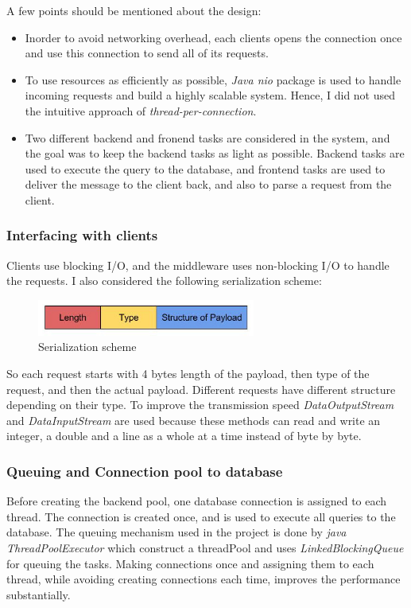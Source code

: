 \documentclass[11pt]{article}
\begin{document}
A few points should be mentioned about the design: 
\begin{itemize}
 \item Inorder to avoid networking overhead, each clients opens the connection once 
 and use this connection to send all of its requests.
 \item To use resources as efficiently as possible, \emph{Java nio} package is used 
 to handle incoming requests and build a highly scalable system. Hence, I did not used the intuitive approach of 
 \emph{thread-per-connection}. 
 \item Two different backend and fronend tasks are considered in the system, and 
 the goal was to keep the backend tasks as light as possible. Backend tasks are 
 used to execute the query to the database, and frontend tasks are used to deliver 
 the message to the client back, and also to parse a request from the client.
\end{itemize}

\subsubsection{Interfacing with clients}\label{sec:interfacing-with-clients}
Clients use blocking I/O, and the middleware uses non-blocking I/O to handle the 
requests. I also considered the following serialization scheme:

\begin{figure}[!ht]
  \includegraphics[width=0.64\textwidth,page=1]{figures/serialization}
  \centering
  \caption{Serialization scheme}
  \label{fig:serialization}
\end{figure}

So each request starts with 4 bytes length of the payload, then type of the request,
and then the actual payload. Different requests have different structure depending 
on their type. To improve the transmission speed \emph{DataOutputStream} and 
\emph{DataInputStream} are used because these methods can read and write an integer, 
a double and a line as a whole at a time instead of byte by byte.

\subsubsection{Queuing and Connection pool to database}\label{sec:queuing-and-connection-pool-to-database}
Before creating the backend pool, one database connection is assigned to each thread.
The connection is created once, and is used to execute all queries to the database.
The queuing mechanism used in the project is done by \emph{java ThreadPoolExecutor} 
which construct a threadPool and uses \emph{LinkedBlockingQueue} for queuing the tasks.
Making connections once and assigning them to each thread, while avoiding creating
connections each time, improves the performance substantially.
\end{document}

